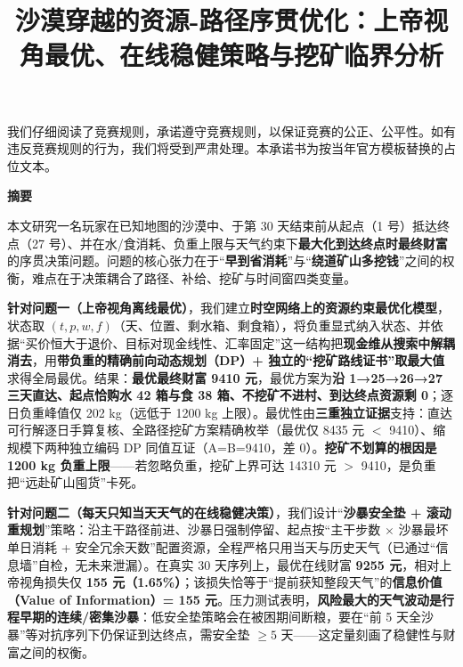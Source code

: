 \documentclass[12pt,a4paper]{ctexart}
\title{\textbf{沙漠穿越的资源-路径序贯优化：上帝视角最优、在线稳健策略与挖矿临界分析}}
\author{}
\date{}
\begin{document}
\thispagestyle{empty}
\noindent 我们仔细阅读了竞赛规则，承诺遵守竞赛规则，以保证竞赛的公正、公平性。如有违反竞赛规则的行为，我们将受到严肃处理。本承诺书为按当年官方模板替换的占位文本。
\newpage

\maketitle
\vspace{-2em}
\begin{center}\textbf{\large 摘\quad 要}\end{center}
\noindent
本文研究一名玩家在已知地图的沙漠中、于第 30 天结束前从起点（1 号）抵达终点（27 号）、并在水/食消耗、负重上限与天气约束下\textbf{最大化到达终点时最终财富}的序贯决策问题。问题的核心张力在于“\textbf{早到省消耗}”与“\textbf{绕道矿山多挖钱}”之间的权衡，难点在于决策耦合了路径、补给、挖矿与时间窗四类变量。

\textbf{针对问题一（上帝视角离线最优）}，我们建立\textbf{时空网络上的资源约束最优化模型}，状态取 $(t,p,w,f)$（天、位置、剩水箱、剩食箱），将负重显式纳入状态、并依据“买价恒大于退价、目标对现金线性、汇率固定”这一结构把\textbf{现金维从搜索中解耦消去}，用\textbf{带负重的精确前向动态规划（DP）+ 独立的“挖矿路线证书”取最大值}求得全局最优。结果：\textbf{最优最终财富 9410 元}，最优方案为\textbf{沿 1→25→26→27 三天直达、起点恰购水 42 箱与食 38 箱、不挖矿不进村、到达终点资源剩 0}；逐日负重峰值仅 202 kg（远低于 1200 kg 上限）。最优性由\textbf{三重独立证据}支持：直达可行解逐日手算复核、全路径挖矿方案精确枚举（最优仅 8435 元 $<$ 9410）、缩规模下两种独立编码 DP 同值互证（A=B=9410，差 0）。\textbf{挖矿不划算的根因是 1200 kg 负重上限}——若忽略负重，挖矿上界可达 14310 元 $>$ 9410，是负重把“远赴矿山囤货”卡死。

\textbf{针对问题二（每天只知当天天气的在线稳健决策）}，我们设计“\textbf{沙暴安全垫 + 滚动重规划}”策略：沿主干路径前进、沙暴日强制停留、起点按“主干步数 $\times$ 沙暴最坏单日消耗 + 安全冗余天数”配置资源，全程严格只用当天与历史天气（已通过“信息墙”自检，无未来泄漏）。在真实 30 天序列上，最优在线财富 \textbf{9255 元}，相对上帝视角损失仅 \textbf{155 元（1.65\%）}；该损失恰等于“提前获知整段天气”的\textbf{信息价值（Value of Information）= 155 元}。压力测试表明，\textbf{风险最大的天气波动是行程早期的连续/密集沙暴}：低安全垫策略会在被困期间断粮，要在“前 5 天全沙暴”等对抗序列下仍保证到达终点，需安全垫 $\ge 5$ 天——这定量刻画了稳健性与财富之间的权衡。
\end{document}
